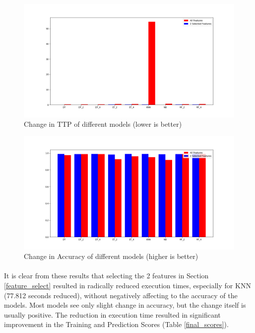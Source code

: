 \begin{figure}[h]
    \hfill\includegraphics[width=1\textwidth]{Chapter4/ttp_improvement}\hspace*{\fill}
    \caption{Change in TTP of different models (lower is better)}
    \label{ttp_improvement}
\end{figure}

\begin{figure}[h]
    \hfill\includegraphics[width=1\textwidth]{Chapter4/acc_improvement}\hspace*{\fill}
    \caption{Change in Accuracy of different models (higher is better)}
    \label{acc_improvement}
\end{figure}

\paragraph{}
It is clear from these results that selecting the 2 features in Section \ref{feature_select} resulted in radically reduced execution times, especially for KNN (77.812 seconds reduced), without negatively affecting to the accuracy of the models. Most models see only slight change in accuracy, but the change itself is usually positive. The reduction in execution time resulted in significant improvement in the Training and Prediction Scores (Table \ref{final_scores}).

